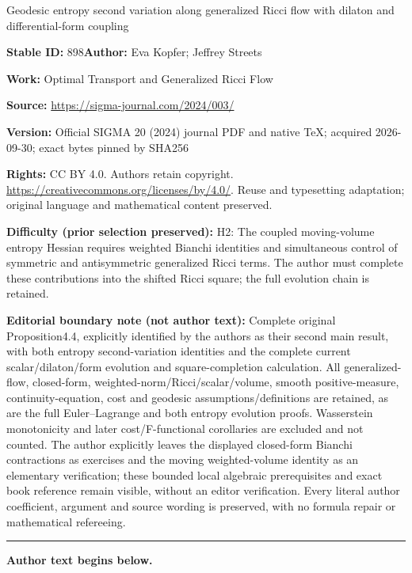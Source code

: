 \documentclass[11pt]{article}
\numberwithin{equation}{section}
\numberwithin{equation}{section}
\begin{document}
\begin{center}\Large Geodesic entropy second variation along generalized Ricci flow with dilaton and differential-form coupling\end{center}
\noindent\textbf{Stable ID:} 898\quad\textbf{Author:} Eva Kopfer; Jeffrey Streets\par
\noindent\textbf{Work:} Optimal Transport and Generalized Ricci Flow\par
\noindent\textbf{Source:} \url{https://sigma-journal.com/2024/003/}\par
\noindent\textbf{Version:} Official SIGMA 20 (2024) journal PDF and native TeX; acquired 2026-09-30; exact bytes pinned by SHA256\par
\noindent\textbf{Rights:} CC BY 4.0. Authors retain copyright. \url{https://creativecommons.org/licenses/by/4.0/}. Reuse and typesetting adaptation; original language and mathematical content preserved.\par
\noindent\textbf{Difficulty (prior selection preserved):} {\CJKfont H2: The coupled moving-volume entropy Hessian requires weighted Bianchi identities and simultaneous control of symmetric and antisymmetric generalized Ricci terms. The author must complete these contributions into the shifted Ricci square; the full evolution chain is retained.}\par
\medskip\noindent\textbf{Editorial boundary note (not author text):} Complete original Proposition4.4, explicitly identified by the authors as their second main result, with both entropy second-variation identities and the complete current scalar/dilaton/form evolution and square-completion calculation. All generalized-flow, closed-form, weighted-norm/Ricci/scalar/volume, smooth positive-measure, continuity-equation, cost and geodesic assumptions/definitions are retained, as are the full Euler–Lagrange and both entropy evolution proofs. Wasserstein monotonicity and later cost/F-functional corollaries are excluded and not counted. The author explicitly leaves the displayed closed-form Bianchi contractions as exercises and the moving weighted-volume identity as an elementary verification; these bounded local algebraic prerequisites and exact book reference remain visible, without an editor verification. Every literal author coefficient, argument and source wording is preserved, with no formula repair or mathematical refereeing.\par
\medskip\hrule\medskip\noindent\textbf{Author text begins below.}\par
\end{document}
